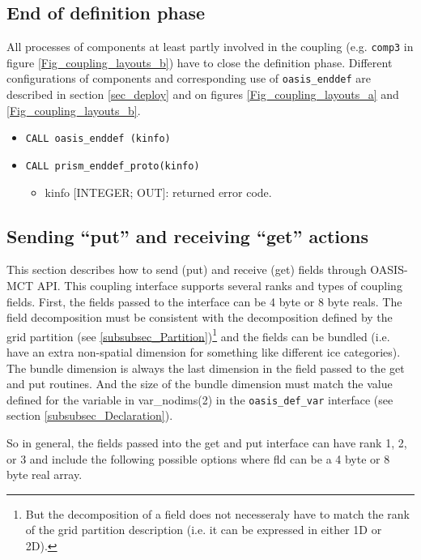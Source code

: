 \subsection{End of definition phase}
\label{subsubsec_Endofdefinition}
All processes of components at least partly involved in the coupling (e.g. {\tt comp3} in figure
    \ref{Fig_coupling_layouts_b}) have to close the definition phase. Different configurations of components and corresponding use of {\tt oasis\_enddef} are described in section \ref{sec_deploy} and on figures \ref{Fig_coupling_layouts_a} and \ref{Fig_coupling_layouts_b}.
\begin{itemize}
\item {\tt CALL oasis\_enddef (kinfo)}
\item {\tt CALL prism\_enddef\_proto(kinfo)}
  \begin{itemize}
  \item kinfo [INTEGER; OUT]: returned error code.
  \end{itemize}
\end{itemize}


\subsection{Sending ``put'' and receiving ``get'' actions}
\label{subsubsec_sendingreceiving}

This section describes how to send (put) and receive (get) fields through
OASIS-MCT API.  This coupling interface supports several ranks and
types of coupling fields.  First, the fields passed to the interface can be 
4 byte or 8 byte reals. The field decomposition must be 
consistent with the decomposition defined by the grid partition (see
\ref{subsubsec_Partition})\footnote{But the decomposition of a
  field does not necesseraly have to match the rank of the grid
  partition description (i.e. it can be expressed in either 1D or 2D).} and the fields
can be bundled (i.e. have an extra non-spatial dimension for something
like different ice categories).  The bundle dimension is always the last dimension in the
field passed to the get and put routines.  And the size of the bundle dimension
must match the value defined for the variable in var\_nodims(2) in the
{\tt oasis\_def\_var} interface (see section \ref{subsubsec_Declaration}).

So in general, the fields passed into the get and put interface can have rank
1, 2, or 3 and include the following possible options where fld can be a 4
byte or 8 byte real array.

